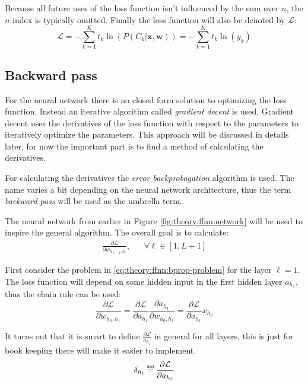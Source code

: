 Because all future uses of the loss function isn't influenced by the sum over $n$, the $n$ index is typically omitted. Finally the loss function will also be denoted by $\mathcal{L}$:
\begin{equation}
\mathcal{L} = - \sum_{k=1}^K t_{k} \ln\left( P(C_{k} | \mathbf{x}, \mathbf{w})\right) =  - \sum_{k=1}^K t_k \ln(y_k)
\label{eq:theory:ffnn:loss}
\end{equation}

\subsection{Backward pass}

For the neural network there is no closed form solution to optimizing the loss function. Instead an iterative algorithm called \textit{gradient decent} is used. Gradient decent uses the derivatives of the loss function with respect to the parameters to iteratively optimize the parameters. This approach will be discussed in details later, for now the important part is to find a method of calculating the derivatives.

For calculating the derivatives the \textit{error backprobagation} algorithm is used. The name varies a bit depending on the neural network architecture, thus the term \textit{backward pass} will be used as the umbrella term.

The neural network from earlier in Figure \ref{fig:theory:ffnn:network} will be used to inspire the general algorithm. The overall goal is to calculate:
\begin{equation}
\begin{aligned}
\frac{\partial \mathcal{L}}{\partial w_{h_{\ell-1}, h_\ell}}, && \forall \ell \in [1, L + 1]
\end{aligned}
\label{eq:theory:ffnn:bprop-problem}
\end{equation} 

First consider the problem in \eqref{eq:theory:ffnn:bprop-problem} for the layer $\ell = 1$. The loss function will depend on some hidden input in the first hidden layer $a_{h_1}$, thus the chain rule can be used:
\begin{equation}
\frac{\partial \mathcal{L}}{\partial w_{h_0, h_1}} = \frac{\partial \mathcal{L}}{\partial a_{h_1}} \frac{\partial a_{h_1}}{\partial w_{h_0, h_1}} =  \frac{\partial \mathcal{L}}{\partial a_{h_1}} x_{h_0}
\label{eq:theory:ffnn:bprop-firstlayer}
\end{equation}

It turns out that it is smart to define $\frac{\partial \mathcal{L}}{a_{h_1}}$ in general for all layers, this is just for book keeping there will make it easier to implement.
\begin{equation}
\delta_{h_\ell} \defeq \frac{\partial \mathcal{L}}{\partial a_{h_\ell}}
\end{equation}

